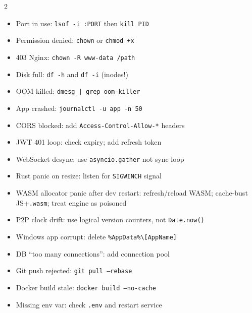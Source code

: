 \documentclass[11pt, letterpaper]{article}
\begin{document}
\begin{tcolorbox}[colback=part6bg, colframe=sectionred,
  title={\bfseries Common Fixes at a Glance}, arc=3pt, boxrule=1pt]
\footnotesize
\begin{multicols}{2}
\begin{itemize}[noitemsep, leftmargin=*]
  \item Port in use: \texttt{lsof -i :PORT} then \texttt{kill PID}
  \item Permission denied: \texttt{chown} or \texttt{chmod +x}
  \item 403 Nginx: \texttt{chown -R www-data /path}
  \item Disk full: \texttt{df -h} and \texttt{df -i} (inodes!)
  \item OOM killed: \texttt{dmesg | grep oom-killer}
  \item App crashed: \texttt{journalctl -u app -n 50}
  \item CORS blocked: add \texttt{Access-Control-Allow-*} headers
  \item JWT 401 loop: check expiry; add refresh token
\end{itemize}
\columnbreak
\begin{itemize}[noitemsep, leftmargin=*]
  \item WebSocket desync: use \texttt{asyncio.gather} not sync loop
  \item Rust panic on resize: listen for \texttt{SIGWINCH} signal
  \item WASM allocator panic after dev restart: refresh/reload WASM; cache-bust JS+\texttt{.wasm}; treat engine as poisoned
  \item P2P clock drift: use logical version counters, not \texttt{Date.now()}
  \item Windows app corrupt: delete \texttt{\%AppData\%\textbackslash[AppName]}
  \item DB ``too many connections'': add connection pool
  \item Git push rejected: \texttt{git pull --rebase}
  \item Docker build stale: \texttt{docker build --no-cache}
  \item Missing env var: check \texttt{.env} and restart service
\end{itemize}
\end{multicols}
\end{tcolorbox}
\end{document}

